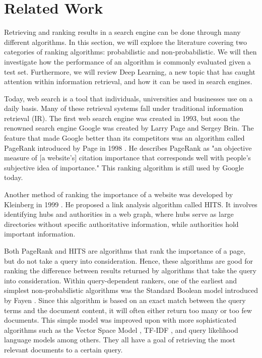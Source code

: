 \section{Related Work}
Retrieving and ranking results in a search engine can be done through many different algorithms. In this section, we will explore the literature covering two categories of ranking algorithms: probabilistic and non-probabilistic. We will then investigate how the performance of an algorithm is commonly evaluated given a test set. Furthermore, we will review Deep Learning, a new topic that has caught attention within information retrieval, and how it can be used in search engines.

Today, web search is a tool that individuals, universities and businesses use on a daily basis. Many of these retrieval systems fall under traditional information retrieval (IR). The first web search engine was created in 1993, but soon the renowned search engine Google was created by Larry Page and Sergey Brin. The feature that made Google better than its competitors was an algorithm called PageRank introduced by Page in 1998 \cite{brin1998anatomy}. He describes PageRank as "an objective measure of [a website's] citation importance that corresponds well with people's subjective idea of importance." This ranking algorithm is still used by Google today.

Another method of ranking the importance of a website was developed by Kleinberg in 1999 \cite{kleinberg1999authoritative}. He proposed a link analysis algorithm called HITS. It involves identifying hubs and authorities in a web graph, where hubs serve as large directories without specific authoritative information, while authorities hold important information. %

Both PageRank and HITS are algorithms that rank the importance of a page, but do not take a query into consideration.
Hence, these algorithms are good for ranking the difference between results returned by algorithms that take the query into consideration.
Within query-dependent rankers, one of the earliest and simplest non-probabilistic algorithms was the Standard Boolean model introduced by Fayen \cite{lancaster1973fayen}. Since this algorithm is based on an exact match between the query terms and the document content, it will often either return too many or too few documents. This simple model was improved upon with more sophisticated algorithms such as the Vector Space Model \cite{salton1975vector}, TF-IDF \cite{salton1983mcgill}, and query likelihood language models \cite{zhai2001model} among others. They all have a goal of retrieving the most relevant documents to a certain query.

